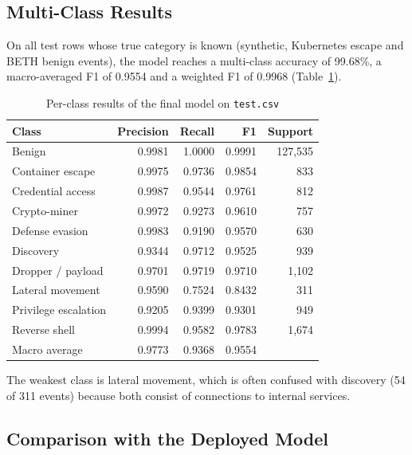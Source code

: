 \subsection{Multi-Class Results}

On all test rows whose true category is known (synthetic, Kubernetes escape and BETH
benign events), the model reaches a multi-class accuracy of 99.68\%, a macro-averaged
F1 of 0.9554 and a weighted F1 of 0.9968 (Table~\ref{tab:multiclass}).

\begin{table}[H]
\centering
\caption{Per-class results of the final model on \texttt{test.csv}}
\label{tab:multiclass}
\small
\begin{tabular}{lrrrr}
\toprule
\textbf{Class} & \textbf{Precision} & \textbf{Recall} & \textbf{F1} & \textbf{Support} \\
\midrule
Benign               & 0.9981 & 1.0000 & 0.9991 & 127,535 \\
Container escape     & 0.9975 & 0.9736 & 0.9854 & 833 \\
Credential access    & 0.9987 & 0.9544 & 0.9761 & 812 \\
Crypto-miner         & 0.9972 & 0.9273 & 0.9610 & 757 \\
Defense evasion      & 0.9983 & 0.9190 & 0.9570 & 630 \\
Discovery            & 0.9344 & 0.9712 & 0.9525 & 939 \\
Dropper / payload    & 0.9701 & 0.9719 & 0.9710 & 1,102 \\
Lateral movement     & 0.9590 & 0.7524 & 0.8432 & 311 \\
Privilege escalation & 0.9205 & 0.9399 & 0.9301 & 949 \\
Reverse shell        & 0.9994 & 0.9582 & 0.9783 & 1,674 \\
\midrule
Macro average        & 0.9773 & 0.9368 & 0.9554 & \\
\bottomrule
\end{tabular}
\end{table}

The weakest class is lateral movement, which is often confused with discovery (54 of
311 events) because both consist of connections to internal services.

\subsection{Comparison with the Deployed Model}

